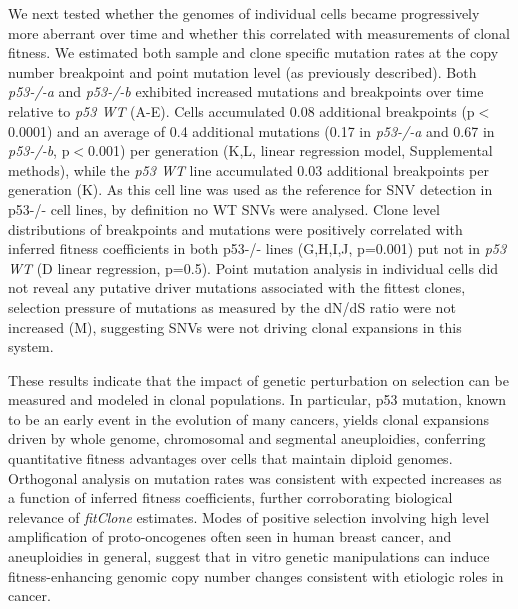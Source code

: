 We next tested whether the genomes of individual cells became progressively more aberrant over time and whether this correlated with measurements of clonal fitness. We estimated both sample and clone specific mutation rates at the copy number breakpoint and point mutation level (as previously described\cite{Laks2019-dm}). Both \textit{p53-/-a} and \textit{p53-/-b} exhibited increased mutations and breakpoints over time relative to \textit{p53 WT}  (A-E). Cells accumulated 0.08 additional breakpoints (p$<$0.0001) and an average of 0.4 additional mutations (0.17 in \textit{p53-/-a} and 0.67 in \textit{p53-/-b}, p$<$0.001) per generation (K,L, linear regression model, Supplemental methods), while the \textit{p53 WT} line accumulated 0.03 additional breakpoints per generation (K). As this cell line was used as the reference for SNV detection in p53-/- cell lines, by definition no WT SNVs were analysed. Clone level distributions of breakpoints and mutations were positively correlated with inferred fitness coefficients in both p53-/- lines (G,H,I,J, p=0.001) put not in \textit{p53 WT} (D linear regression, p=0.5). Point mutation analysis in individual cells did not reveal any putative driver mutations associated with the fittest clones, selection pressure of mutations as measured by the dN/dS ratio\cite{Martincorena2017-jr} were not increased (M), suggesting SNVs were not driving clonal expansions in this system.

These results indicate that the impact of genetic perturbation on selection can be measured and modeled in clonal populations. In particular, p53 mutation, known to be an early event in the evolution of many cancers\cite{ICGCTCGA_Pan-Cancer_Analysis_of_Whole_Genomes_Consortium2020-ef}, yields clonal expansions driven by whole genome, chromosomal and segmental aneuploidies, conferring quantitative fitness advantages over cells that maintain diploid genomes. Orthogonal analysis on mutation rates was consistent with expected increases as a function of inferred fitness coefficients, further corroborating biological relevance of \textit{fitClone} estimates. Modes of positive selection involving high level amplification of proto-oncogenes often seen in human breast cancer, and aneuploidies in general, suggest that in vitro genetic manipulations can induce fitness-enhancing genomic copy number changes consistent with etiologic roles in cancer. 


